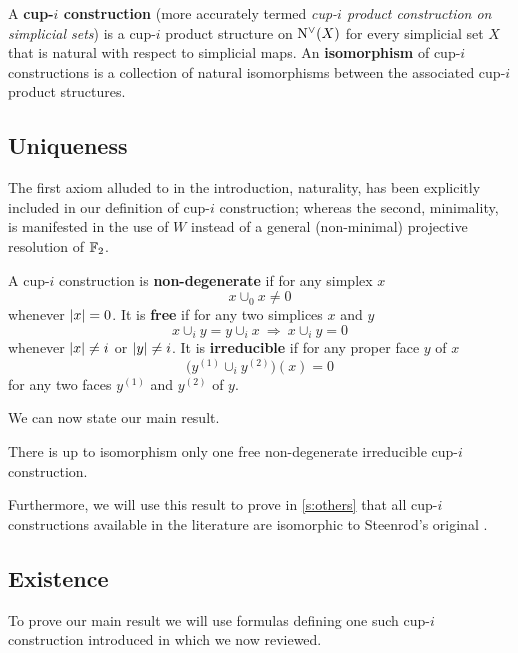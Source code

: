 \begin{definition}
	A \textbf{cup-$i$ construction} (more accurately termed \emph{cup-$i$ product construction on simplicial sets}) is a cup-$i$ product structure on $\operatorname{N^{\vee}}(X)$ for every simplicial set $X$ that is natural with respect to simplicial maps.
	An \textbf{isomorphism} of cup-$i$ constructions is a collection of natural isomorphisms between the associated cup-$i$ product structures.
\end{definition}

\subsection{Uniqueness}

The first axiom alluded to in the introduction, naturality, has been explicitly included in our definition of cup-$i$ construction; whereas the second, minimality, is manifested in the use of $W$ instead of a general (non-minimal) projective resolution of ${\mathbb{F}_2}$.

\begin{definition} \label{d:properties of cup-i constructions}
	A cup-$i$ construction is \textbf{non-degenerate} if for any simplex $x$
	\[
	\boxed{x \cup_0 x \neq 0}
	\]
	whenever $\lvert x\rvert = 0$.
	It is \textbf{free} if for any two simplices $x$ and $y$
	\[
	\boxed{x \cup_{i} y = y \cup_{i} x} \
	\Longrightarrow \
	\boxed{x \cup_{i} y = 0}
	\]
	whenever $\lvert x\rvert \neq i$ or $\lvert y\rvert \neq i$.
	It is \textbf{irreducible} if for any proper face $y$ of $x$
	\[
	\boxed{\Big( y^{(1)} \cup_{i} y^{(2)} \Big)(x) = 0}
	\]
	for any two faces $y^{(1)}$ and $y^{(2)}$ of $y$.
\end{definition}

We can now state our main result.

\begin{theorem} \label{t:main}
	There is up to isomorphism only one free non-degenerate irreducible cup-$i$ construction.
\end{theorem}

Furthermore, we will use this result to prove in \cref{s:others} that all cup-$i$ constructions available in the literature are isomorphic to Steenrod's original \cite{steenrod1947products}.

\subsection{Existence}

To prove our main result we will use formulas defining one such cup-$i$ construction introduced in \cite{medina2021fast_sq} which we now reviewed.

